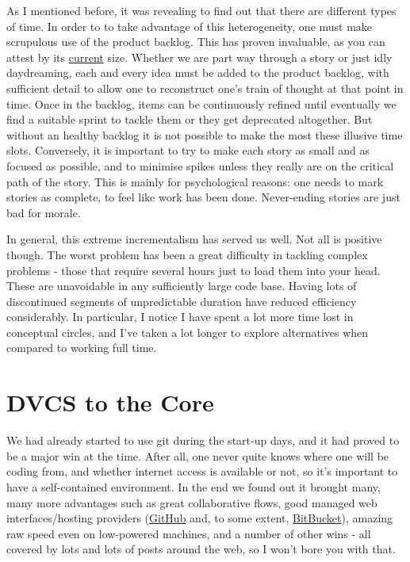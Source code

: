 \documentclass{book}
\begin{document}
As I mentioned before, it was revealing to find out that there are
different types of time. In order to to take advantage of this
heterogeneity, one must make scrupulous use of the product
backlog. This has proven invaluable, as you can attest by its \href{https://github.com/DomainDrivenConsulting/dogen/blob/master/doc/agile/product_backlog.org}{current}
size. Whether we are part way through a story or just idly
daydreaming, each and every idea must be added to the product backlog,
with sufficient detail to allow one to reconstruct one's train of
thought at that point in time. Once in the backlog, items can be
continuously refined until eventually we find a suitable sprint to
tackle them or they get deprecated altogether. But without an healthy
backlog it is not possible to make the most these illusive time
slots. Conversely, it is important to try to make each story as small
and as focused as possible, and to minimise spikes unless they really
are on the critical path of the story. This is mainly for
psychological reasons: one needs to mark stories as complete, to feel
like work has been done. Never-ending stories are just bad for morale.

In general, this extreme incrementalism has served us well. Not all is
positive though. The worst problem has been a great difficulty in
tackling complex problems - those that require several hours just to
load them into your head. These are unavoidable in any sufficiently
large code base. Having lots of discontinued segments of unpredictable
duration have reduced efficiency considerably. In particular, I notice
I have spent a lot more time lost in conceptual circles, and I've
taken a lot longer to explore alternatives when compared to working
full time.

\section*{DVCS to the Core}
\label{sec-3}

We had already started to use git during the start-up days, and it had
proved to be a major win at the time. After all, one never quite knows
where one will be coding from, and whether internet access is
available or not, so it's important to have a self-contained
environment. In the end we found out it brought many, many more
advantages such as great collaborative flows, good managed web
interfaces/hosting providers (\href{http://www.github.com}{GitHub} and, to some extent, \href{http://www.bitbucket.com}{BitBucket}),
amazing raw speed even on low-powered machines, and a number of other
wins - all covered by lots and lots of posts around the web, so I
won't bore you with that.
\end{document}
